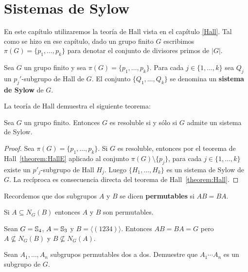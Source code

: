 
\chapter{Sistemas de Sylow}
\label{Sylow}

En este capítulo utilizaremos la teoría de Hall vista en el capítulo \ref{Hall}. 
Tal como se hizo en ese capítulo, dado un grupo finito $G$ 
escribimos $\pi(G)=\{p_1,\dots,p_k\}$ para denotar el
conjunto de divisores primos de $|G|$. 

\begin{definition}
	Sea $G$ un grupo finito y sea $\pi(G)=\{p_1,\dots,p_k\}$. Para cada $j\in
	\{1,\dots,k\}$ sea $Q_j$ un $p_j'$-subgrupo de Hall de $G$. El conjunto
	$\{Q_1,\dots,Q_k\}$ se denomina un \textbf{sistema de Sylow} de $G$.
\end{definition}

La teoría de Hall demuestra el siguiente teorema:

\begin{theorem}
	Sea $G$ un grupo finito. Entonces $G$ es resoluble si y sólo si $G$ admite
	un sistema de Sylow.	
\end{theorem}

\begin{proof}
	Sea $\pi(G)=\{p_1,\dots,p_k\}$. Si $G$ es resoluble, entonces por el
	teorema de Hall~\ref{theorem:HallE} aplicado al conjunto
	$\pi(G)\setminus\{p_j\}$, para cada $j\in\{1,\dots,k\}$ existe un
	$p'_j$-subgrupo de Hall $H_j$. Luego $\{H_1,\dots,H_k\}$ es un sistema de
	Sylow de $G$. La recíproca es consecuencia directa del teorema de
	Hall~\ref{theorem:Hall}.
\end{proof}

Recordemos que dos subgrupos $A$ y $B$ se dicen
\textbf{permutables} si $AB=BA$.

\begin{example}
	Si $A\subseteq N_G(B)$ entonces $A$ y $B$ son permutables.
\end{example}

\begin{example}
	Sean $G=\mathbb{S}_4$, $A=\mathbb{S}_3$ y $B=\langle (1234)\rangle$. Entonces $AB=BA=G$
	pero $A\not\subseteq N_G(B)$ y $B\not\subseteq N_G(A)$.
\end{example}

\begin{exercise}
	Sean $A_1,\dots,A_n$ subgrupos permutables dos a dos. Demuestre que
	$A_1\cdots A_n$ es un subgrupo de $G$.
\end{exercise}

